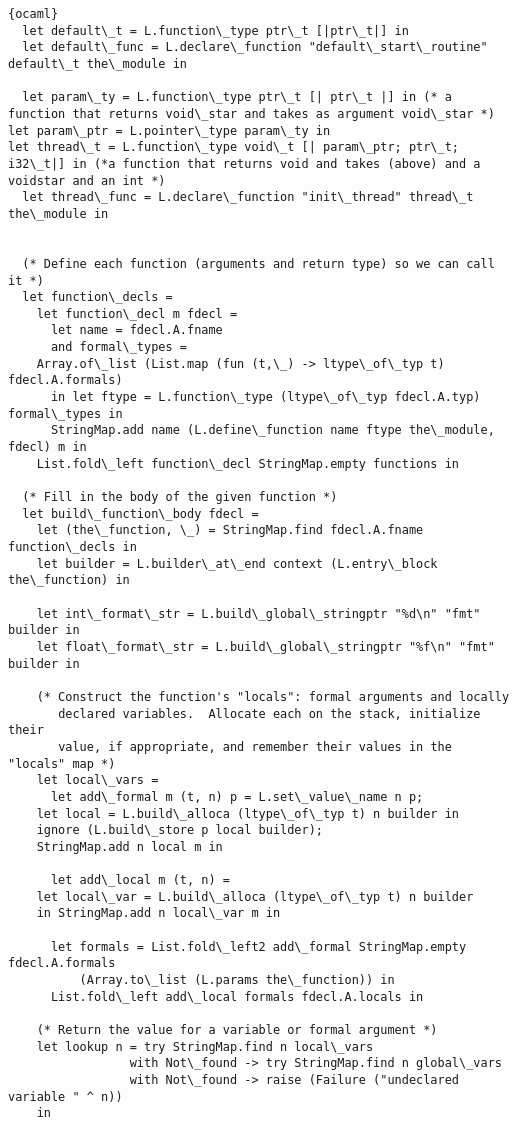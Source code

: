 \begin{lstlisting}{ocaml}
  let default\_t = L.function\_type ptr\_t [|ptr\_t|] in
  let default\_func = L.declare\_function "default\_start\_routine" default\_t the\_module in

  let param\_ty = L.function\_type ptr\_t [| ptr\_t |] in (* a function that returns void\_star and takes as argument void\_star *)
let param\_ptr = L.pointer\_type param\_ty in  
let thread\_t = L.function\_type void\_t [| param\_ptr; ptr\_t; i32\_t|] in (*a function that returns void and takes (above) and a voidstar and an int *)
  let thread\_func = L.declare\_function "init\_thread" thread\_t the\_module in


  (* Define each function (arguments and return type) so we can call it *)
  let function\_decls =
    let function\_decl m fdecl =
      let name = fdecl.A.fname
      and formal\_types =
	Array.of\_list (List.map (fun (t,\_) -> ltype\_of\_typ t) fdecl.A.formals)
      in let ftype = L.function\_type (ltype\_of\_typ fdecl.A.typ) formal\_types in
      StringMap.add name (L.define\_function name ftype the\_module, fdecl) m in
    List.fold\_left function\_decl StringMap.empty functions in
  
  (* Fill in the body of the given function *)
  let build\_function\_body fdecl =
    let (the\_function, \_) = StringMap.find fdecl.A.fname function\_decls in
    let builder = L.builder\_at\_end context (L.entry\_block the\_function) in

    let int\_format\_str = L.build\_global\_stringptr "%d\n" "fmt" builder in
    let float\_format\_str = L.build\_global\_stringptr "%f\n" "fmt" builder in   
 
    (* Construct the function's "locals": formal arguments and locally
       declared variables.  Allocate each on the stack, initialize their
       value, if appropriate, and remember their values in the "locals" map *)
    let local\_vars =
      let add\_formal m (t, n) p = L.set\_value\_name n p;
	let local = L.build\_alloca (ltype\_of\_typ t) n builder in
	ignore (L.build\_store p local builder);
	StringMap.add n local m in

      let add\_local m (t, n) =
	let local\_var = L.build\_alloca (ltype\_of\_typ t) n builder
	in StringMap.add n local\_var m in

      let formals = List.fold\_left2 add\_formal StringMap.empty fdecl.A.formals
          (Array.to\_list (L.params the\_function)) in
      List.fold\_left add\_local formals fdecl.A.locals in

    (* Return the value for a variable or formal argument *)
    let lookup n = try StringMap.find n local\_vars
                 with Not\_found -> try StringMap.find n global\_vars
                 with Not\_found -> raise (Failure ("undeclared variable " ^ n))
    in


\end{lstlisting}
